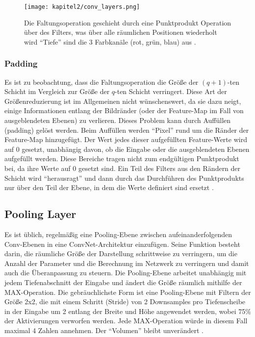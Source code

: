     \begin{figure}[H]
        \centering
        \texttt{[image: kapitel2/conv\_layers.png]}
        \caption[Die Faltung in einem CNN]{Die Faltungsoperation geschieht durch eine Punktprodukt Operation über des Filters, was über alle räumlichen Positionen wiederholt wird \enquote{Tiefe} sind die 3 Farbkanäle (rot, grün, blau) aus \cite*[321]{Aggarwal2018}.}
        \label{Kap2:Conv}
    \end{figure}

    \subsubsection{Padding}
    Es ist zu beobachtung, dass die Faltungsoperation die Größe der $(q + 1)$-ten Schicht im Vergleich zur Größe der $q$-ten Schicht verringert. Diese Art der Größenreduzierung ist im Allgemeinen nicht wünschenswert, da sie dazu neigt, einige Informationen entlang der Bildränder (oder der Feature-Map im Fall von ausgeblendeten Ebenen) zu verlieren. Dieses Problem kann durch Auffüllen (padding) gelöst werden. Beim Auffüllen werden  \enquote{Pixel} rund um die Ränder der Feature-Map hinzugefügt. Der Wert jedes dieser aufgefüllten Feature-Werte wird auf 0 gesetzt, unabhängig davon, ob die Eingabe oder die ausgeblendeten Ebenen aufgefüllt werden. Diese Bereiche tragen nicht zum endgültigen Punktprodukt bei, da ihre Werte auf 0 gesetzt sind. Ein Teil des Filters aus den Rändern der Schicht wird \enquote{herausragt} und dann durch das Durchführen des Punktprodukts nur über den Teil der Ebene, in dem die Werte definiert sind ersetzt \cite*[323]{Aggarwal2018}.


\subsection{Pooling Layer}
Es ist üblich, regelmäßig eine Pooling-Ebene zwischen aufeinanderfolgenden Conv-Ebenen in eine ConvNet-Architektur einzufügen. Seine Funktion besteht darin, die räumliche Größe der Darstellung schrittweise zu verringern, um die Anzahl der Parameter und die Berechnung im Netzwerk zu verringern und damit auch die Überanpassung zu steuern. Die Pooling-Ebene arbeitet unabhängig mit jedem Tiefenabschnitt der Eingabe und ändert die Größe räumlich mithilfe der MAX-Operation. Die gebräuchlichste Form ist eine Pooling-Ebene mit Filtern der Größe 2x2, die mit einem Schritt (Stride) von 2 Downsamples pro Tiefenscheibe in der Eingabe um 2 entlang der Breite und Höhe angewendet werden, wobei 75\% der Aktivierungen verworfen werden. Jede MAX-Operation würde in diesem Fall maximal 4 Zahlen annehmen. Der \enquote{Volumen} bleibt unverändert \cite*{StanfordUniversityCoursecs231n2018a}.

